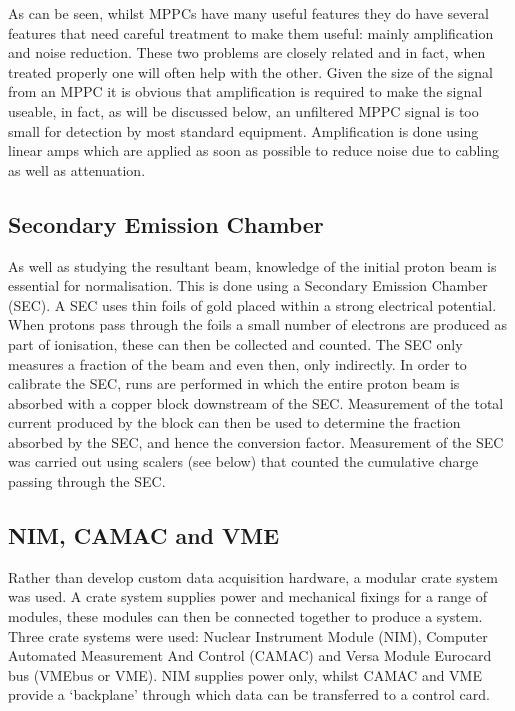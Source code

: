 As can be seen, whilst MPPCs have many useful features they do have several features that need careful treatment to make them useful: mainly amplification and noise reduction. These two problems are closely related and in fact, when treated properly one will often help with the other. Given the size of the signal from an MPPC it is obvious that amplification is required to make the signal useable, in fact, as will be discussed below, an unfiltered MPPC signal is too small for detection by most standard equipment. Amplification is done using linear amps which are applied as soon as possible to reduce noise due to cabling as well as attenuation. 

\subsection{Secondary Emission Chamber} %
\label{sub:secondary_emission_chamber}
As well as studying the resultant beam, knowledge of the initial proton beam is essential for normalisation. This is done using a Secondary Emission Chamber (SEC). A SEC uses thin foils of gold placed within a strong electrical potential. When protons pass through the foils a small number of electrons are produced as part of ionisation, these can then be collected and counted. The SEC only measures a fraction of the beam and even then, only indirectly. In order to calibrate the SEC, runs are performed in which the entire proton beam is absorbed with a copper block downstream of the SEC. Measurement of the total current produced by the block can then be used to determine the fraction absorbed by the SEC, and hence the conversion factor. Measurement of the SEC was carried out using scalers (see below) that counted the cumulative charge passing through the SEC.


\subsection{NIM, CAMAC and VME} %
\label{sub:nim_and_camac}
Rather than develop custom data acquisition hardware, a modular crate system was used. A crate system supplies power and mechanical fixings for a range of modules, these modules can then be connected together to produce a system. Three crate systems were used: Nuclear Instrument Module (NIM), Computer Automated Measurement And Control (CAMAC) and Versa Module Eurocard bus (VMEbus or VME). NIM supplies power only, whilst CAMAC and VME provide a `backplane' through which data can be transferred to a control card.

